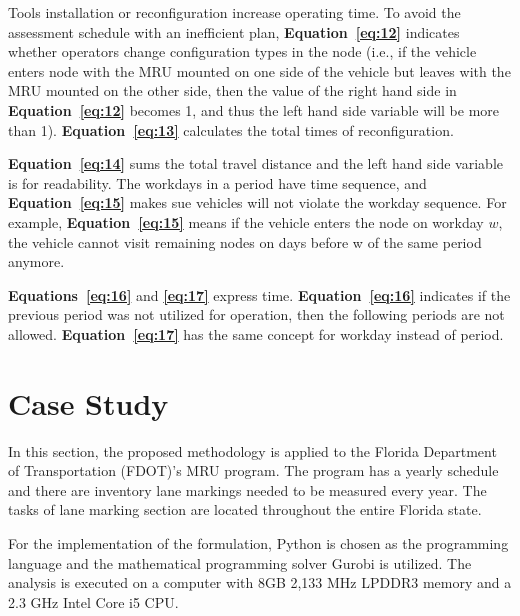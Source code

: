 \documentclass[numbered]{trbunofficial}
\begin{document}
Tools installation or reconfiguration increase operating time. To avoid the assessment schedule with an inefficient plan, \textbf{Equation~\ref{eq:12}} indicates whether operators change configuration types in the node (i.e., if the vehicle enters node with the MRU mounted on one side of the vehicle but leaves with the MRU mounted on the other side, then the value of the right hand side in \textbf{Equation~\ref{eq:12}} becomes 1, and thus the left hand side variable will be more than 1). \textbf{Equation~\ref{eq:13}} calculates the total times of reconfiguration. 

\textbf{Equation~\ref{eq:14}} sums the total travel distance and the left hand side variable is for readability. The workdays in a period have time sequence, and \textbf{Equation~\ref{eq:15}} makes sue vehicles will not violate the workday sequence. For example, \textbf{Equation~\ref{eq:15}} means if the vehicle enters the node on workday $w$, the vehicle cannot visit remaining nodes on days before w of the same period anymore. 

\textbf{Equations~\ref{eq:16}} and \textbf{\ref{eq:17}} express time. \textbf{Equation~\ref{eq:16}} indicates if the previous period was not utilized for operation, then the following periods are not allowed. \textbf{Equation~\ref{eq:17}} has the same concept for workday instead of period. 


\section{Case Study}
In this section, the proposed methodology is applied to the Florida Department of Transportation (FDOT)'s MRU program. The program has a yearly schedule and there are inventory lane markings needed to be measured every year. The tasks of lane marking section are located throughout the entire Florida state.

For the implementation of the formulation, Python is chosen as the programming language and the mathematical programming solver Gurobi \cite{Gurobi} is utilized. The analysis is executed on a computer with 8GB 2,133 MHz LPDDR3 memory and a 2.3 GHz Intel Core i5 CPU.
\end{document}
